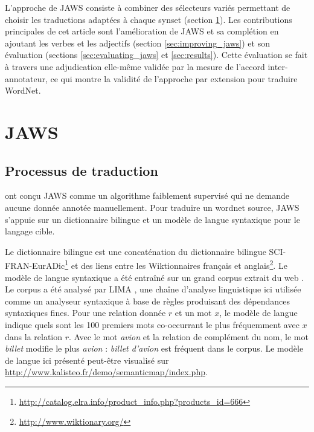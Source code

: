 L'approche de JAWS consiste à combiner des sélecteurs variés permettant de choisir les traductions adaptées à chaque synset (section \ref{sec:jaws}). Les contributions principales de cet article sont l'amélioration de JAWS et sa complétion en ajoutant les verbes et les adjectifs (section \ref{sec:improving_jaws}) et son évaluation (sections \ref{sec:evaluating_jaws} et \ref{sec:results}). Cette évaluation se fait à travers une adjudication elle-même validée par la mesure de l'accord inter-annotateur, ce qui montre la validité de l'approche par extension pour traduire WordNet.

\section{JAWS}
\label{sec:jaws}

\subsection{Processus de traduction}
\label{subsec:translation_process}

\cite{mouton2010jaws} ont conçu JAWS comme un algorithme faiblement supervisé qui ne demande aucune donnée annotée manuellement. Pour traduire un wordnet source, JAWS s'appuie sur un dictionnaire bilingue et un modèle de langue syntaxique pour le langage cible.

Le dictionnaire bilingue est une concaténation du dictionnaire bilingue SCI-FRAN-EurADic\footnote{\url{http://catalog.elra.info/product_info.php?products_id=666}} et des liens entre les Wiktionnaires français et anglais\footnote{\url{http://www.wiktionary.org/}}. Le modèle de langue syntaxique a été entraîné sur un grand corpus extrait du web \citep{grefenstette2007conquering}. Le corpus a été analysé par LIMA \citep{besancon2010lima}, une chaîne d'analyse linguistique ici utilisée comme un analyseur syntaxique à base de règles produisant des dépendances syntaxiques fines. Pour une relation donnée $r$ et un mot $x$, le modèle de langue indique quels sont les 100 premiers mots co-occurrant le plus fréquemment avec $x$ dans la relation $r$. Avec le mot \textit{avion} et la relation de complément du nom, le mot \textit{billet} modifie le plus \textit{avion} : \textit{billet d'avion} est fréquent dans le corpus. Le modèle de langue ici présenté peut-être visualisé sur \url{http://www.kalisteo.fr/demo/semanticmap/index.php}.

